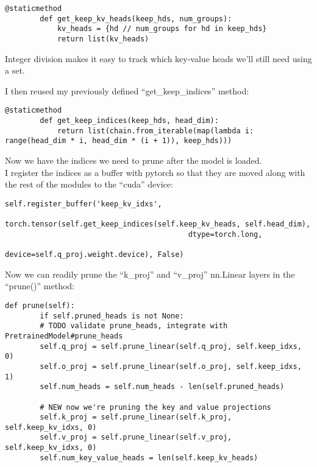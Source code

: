 \documentclass{article}
\begin{document}
    \begin{lstlisting}[label={lst:get_keep_kv_heads}]
        @staticmethod
        def get_keep_kv_heads(keep_hds, num_groups):
            kv_heads = {hd // num_groups for hd in keep_hds}
            return list(kv_heads)
    \end{lstlisting}

    Integer division makes it easy to track which key-value heads we'll still need using a set.

    I then reused my previously defined ``get\_keep\_indices'' method:
    \begin{lstlisting}[label={lst:get_keep_indices}]
        @staticmethod
        def get_keep_indices(keep_hds, head_dim):
            return list(chain.from_iterable(map(lambda i: range(head_dim * i, head_dim * (i + 1)), keep_hds)))
    \end{lstlisting}

    Now we have the indices we need to prune after the model is loaded.
    \\
    I register the indices as a buffer with pytorch so that they are moved along with the rest of the modules to the ``cuda'' device:

    \begin{lstlisting}[label={lst:keep_kv_idxs}]
                self.register_buffer('keep_kv_idxs',
                             torch.tensor(self.get_keep_indices(self.keep_kv_heads, self.head_dim),
                                          dtype=torch.long,
                                          device=self.q_proj.weight.device), False)
    \end{lstlisting}

    Now we can readily prune the ``k\_proj'' and ``v\_proj'' nn.Linear layers in the ``prune()'' method:

    \begin{lstlisting}[label={lst:prune}]
        def prune(self):
        if self.pruned_heads is not None:
        # TODO validate prune_heads, integrate with PretrainedModel#prune_heads
        self.q_proj = self.prune_linear(self.q_proj, self.keep_idxs, 0)
        self.o_proj = self.prune_linear(self.o_proj, self.keep_idxs, 1)
        self.num_heads = self.num_heads - len(self.pruned_heads)

        # NEW now we're pruning the key and value projections
        self.k_proj = self.prune_linear(self.k_proj, self.keep_kv_idxs, 0)
        self.v_proj = self.prune_linear(self.v_proj, self.keep_kv_idxs, 0)
        self.num_key_value_heads = len(self.keep_kv_heads)
    \end{lstlisting}
\end{document}
